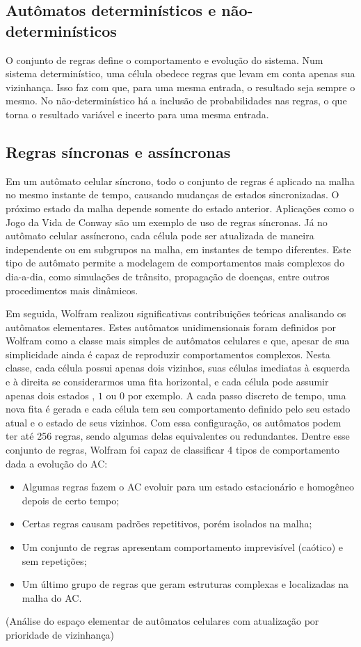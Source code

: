 \subsection{Autômatos determinísticos e não-determinísticos}
O conjunto de regras define o comportamento e evolução do sistema. Num sistema determinístico, uma célula obedece regras que levam em conta apenas sua vizinhança. Isso faz com que, para uma mesma entrada, o resultado seja sempre o mesmo. No não-determinístico há a inclusão de probabilidades nas regras, o que torna o resultado variável e incerto para uma mesma entrada.

\subsection{Regras síncronas e assíncronas}
Em um autômato celular síncrono, todo o conjunto de regras é aplicado na malha no mesmo instante de tempo, causando mudanças de estados sincronizadas. O próximo estado da malha depende somente do estado anterior. Aplicações como o Jogo da Vida de Conway são um exemplo de uso de regras síncronas.
Já no autômato celular assíncrono, cada célula pode ser atualizada de maneira independente ou em subgrupos na malha, em instantes de tempo diferentes. Este tipo de autômato permite a modelagem de comportamentos mais complexos do dia-a-dia, como simulações de trânsito, propagação de doenças, entre outros procedimentos mais dinâmicos.


Em seguida, Wolfram realizou  significativas  contribuições teóricas analisando os autômatos elementares. Estes autômatos unidimensionais foram definidos por Wolfram como a classe mais simples de autômatos celulares e que, apesar de sua simplicidade ainda é capaz de reproduzir comportamentos complexos. Nesta classe, cada célula possui apenas dois vizinhos, suas células imediatas à esquerda e à direita se considerarmos uma fita horizontal, e cada célula pode assumir apenas dois estados , $1$ ou $0$ por exemplo. A cada passo discreto de tempo, uma nova fita é gerada e cada célula tem seu comportamento definido pelo seu estado atual e o estado de seus vizinhos. Com essa configuração, os autômatos podem ter até 256 regras, sendo algumas delas equivalentes ou redundantes. Dentre esse conjunto de regras, Wolfram foi capaz de classificar 4 tipos de comportamento dada a evolução do AC:

\begin{itemize}
    \item Algumas regras fazem o AC evoluir para um estado estacionário e homogêneo depois de certo tempo;
    \item Certas regras causam padrões repetitivos, porém isolados na malha;
    \item Um conjunto de regras apresentam comportamento imprevisível (caótico) e sem repetições;
    \item Um último grupo de regras que geram estruturas complexas e localizadas na malha do AC.
\end{itemize}(Análise do espaço elementar de autômatos celulares com atualização por prioridade de vizinhança)

